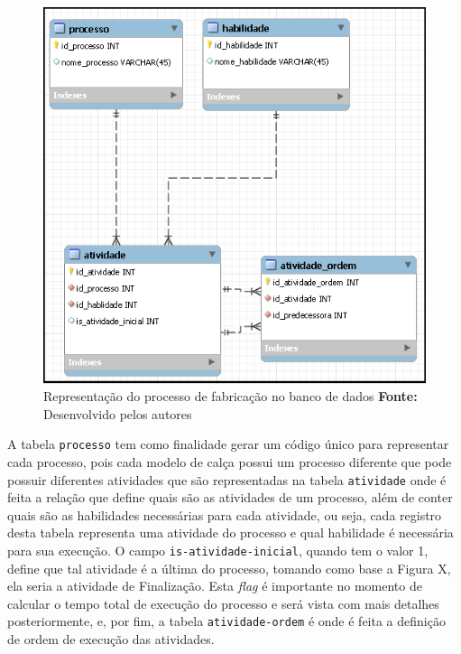 \begin{figure}[h!]
	\centerline{\includegraphics[scale=0.7]{./imagens/representacao_processo.png}}
	\caption[Processo de fabricação]
	{Representação do processo de fabricação no banco de dados \textbf{Fonte:} Desenvolvido pelos autores}
	\label{fig:exemplo1}
\end{figure}

\par A tabela \texttt{processo} tem como finalidade gerar um código único para representar 
cada processo, pois cada modelo de calça possui um processo diferente que pode possuir 
diferentes atividades que são representadas na tabela \texttt{atividade} onde é feita a relação que define quais são
as atividades de um processo,  além de conter quais são as habilidades necessárias para cada atividade, ou seja, cada registro desta 
tabela representa uma atividade do processo e qual habilidade é necessária para sua execução. O campo 
\texttt{is-atividade-inicial}, quando tem o valor 1, define que tal atividade é a última do processo, 
tomando como base a Figura X, ela seria a atividade de Finalização. Esta \textit{flag} é importante no momento de 
calcular o tempo total de execução do processo e será vista com mais detalhes posteriormente, e, por fim, a tabela 
\texttt{atividade-ordem} é onde é feita a definição de ordem de execução das atividades.


